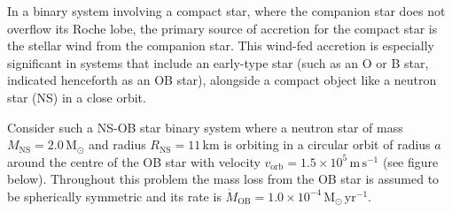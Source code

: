 In a binary system involving a compact star, where the companion star does not
overflow its Roche lobe, the primary source of accretion for the compact star
is the stellar wind from the companion star. This wind-fed accretion is
especially significant in systems that include an early-type star (such as an
O or B star, indicated henceforth as an OB star), alongside a compact object
like a neutron star (NS) in a close orbit.

Consider such a NS-OB star binary system where a neutron star of mass
$M_{\mathrm{NS}} = 2.0\,\mathrm{M}_\odot$ and radius
$R_{\mathrm{NS}} = 11$\,km is orbiting in a circular orbit of radius $a$
around the centre of the OB star with velocity
$v_{\mathrm{orb}} = 1.5 \times 10^5\,\mathrm{m\,s^{-1}}$ (see figure below).
Throughout this problem the mass loss from the OB star is assumed to be
spherically symmetric and its rate is
$\dot{M}_{\mathrm{OB}} = 1.0 \times 10^{-4}\,\mathrm{M}_\odot\,
\mathrm{yr}^{-1}$.


